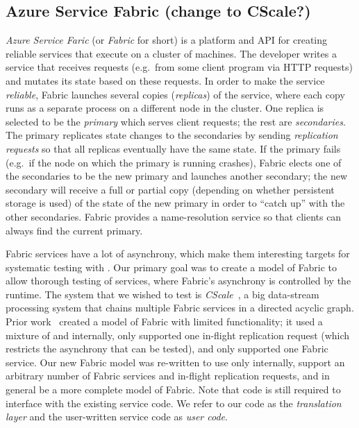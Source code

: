 
\subsection{Azure Service Fabric (change to CScale?)}
\label{sec:cases:fabric}


\emph{Azure Service Faric} (or \emph{Fabric} for short) is a platform and API for creating reliable services that execute on a cluster of machines. The developer writes a service that receives requests (e.g.\ from some client program via HTTP requests) and mutates its state based on these requests. In order to make the service \emph{reliable}, Fabric launches several copies (\emph{replicas}) of the service, where each copy runs as a separate process on a different node in the cluster. One replica is selected to be the \emph{primary} which serves client requests; the rest are \emph{secondaries}. The primary replicates state changes to the secondaries by sending \emph{replication requests} so that all replicas eventually have the same state. If the primary fails (e.g.\ if the node on which the primary is running crashes), Fabric elects one of the secondaries to be the new primary and launches another secondary; the new secondary will receive a full or partial copy (depending on whether persistent storage is used) of the state of the new primary in order to ``catch up'' with the other secondaries. Fabric provides a name-resolution service so that clients can always find the current primary. 

Fabric services have a lot of asynchrony, which make them interesting targets for systematic testing with \psharp{}.
Our primary goal was to create a \psharp{} model of Fabric to allow
thorough testing of services, where Fabric's asynchrony is controlled 
by the \psharp{} runtime.
The system that we wished to test is \emph{CScale}~\cite{X},
a big data-stream processing system that chains multiple Fabric services
in a directed acyclic graph.
Prior work~\cite{deligiannis2015psharp}
created a model of Fabric with limited functionality;
it used a mixture of \csharp{} and \psharp{} internally,
only supported one in-flight replication request
(which restricts the asynchrony that can be tested),
and only supported one Fabric service.
Our new Fabric model was re-written to use only \psharp{}
internally,
support an arbitrary number of Fabric services and in-flight replication requests,
and in general be a more complete model of Fabric.
Note that \csharp{} code is still required to interface with the existing
\csharp{} service code.
We refer to our \csharp{} code
as the \emph{translation layer}
and
 the user-written \csharp{} service code as \emph{user code}. 

